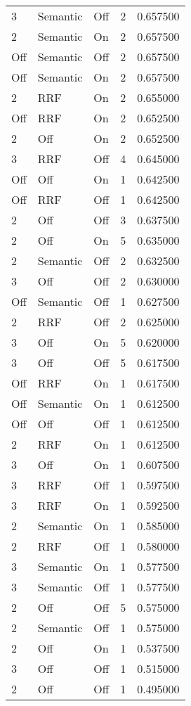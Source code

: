 \begin{tabular}{llllr}
3 & Semantic & Off & 2 & 0.657500 \\
2 & Semantic & On & 2 & 0.657500 \\
Off & Semantic & Off & 2 & 0.657500 \\
Off & Semantic & On & 2 & 0.657500 \\
2 & RRF & On & 2 & 0.655000 \\
Off & RRF & On & 2 & 0.652500 \\
2 & Off & On & 2 & 0.652500 \\
3 & RRF & Off & 4 & 0.645000 \\
Off & Off & On & 1 & 0.642500 \\
Off & RRF & Off & 1 & 0.642500 \\
2 & Off & Off & 3 & 0.637500 \\
2 & Off & On & 5 & 0.635000 \\
2 & Semantic & Off & 2 & 0.632500 \\
3 & Off & Off & 2 & 0.630000 \\
Off & Semantic & Off & 1 & 0.627500 \\
2 & RRF & Off & 2 & 0.625000 \\
3 & Off & On & 5 & 0.620000 \\
3 & Off & Off & 5 & 0.617500 \\
Off & RRF & On & 1 & 0.617500 \\
Off & Semantic & On & 1 & 0.612500 \\
Off & Off & Off & 1 & 0.612500 \\
2 & RRF & On & 1 & 0.612500 \\
3 & Off & On & 1 & 0.607500 \\
3 & RRF & Off & 1 & 0.597500 \\
3 & RRF & On & 1 & 0.592500 \\
2 & Semantic & On & 1 & 0.585000 \\
2 & RRF & Off & 1 & 0.580000 \\
3 & Semantic & On & 1 & 0.577500 \\
3 & Semantic & Off & 1 & 0.577500 \\
2 & Off & Off & 5 & 0.575000 \\
2 & Semantic & Off & 1 & 0.575000 \\
2 & Off & On & 1 & 0.537500 \\
3 & Off & Off & 1 & 0.515000 \\
2 & Off & Off & 1 & 0.495000 \\
\bottomrule
\end{tabular}
